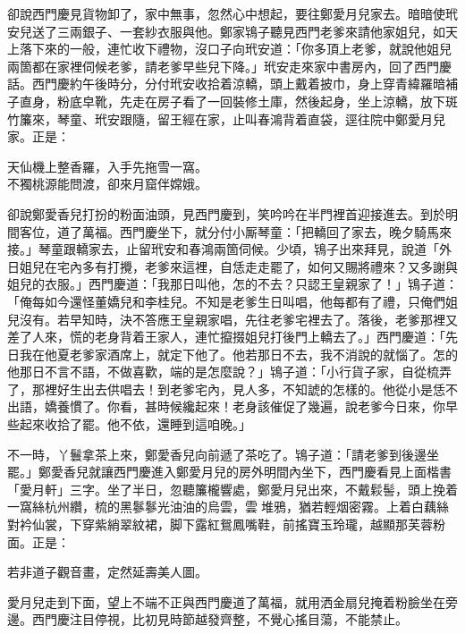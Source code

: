 卻說西門慶見貨物卸了，家中無事，忽然心中想起，要往鄭愛月兒家去。暗暗使玳安兒送了三兩銀子、一套紗衣服與他。鄭家鴇子聽見西門老爹來請他家姐兒，如天上落下來的一般，連忙收下禮物，沒口子向玳安道：「你多頂上老爹，就說他姐兒兩箇都在家裡伺候老爹，請老爹早些兒下降。」玳安走來家中書房內，回了西門慶話。西門慶約午後時分，分付玳安收拾着涼轎，頭上戴着披巾，身上穿青緯羅暗補子直身，粉底皁靴，先走在房子看了一回裝修土庫，然後起身，坐上涼轎，放下斑竹簾來，琴童、玳安跟隨，留王經在家，止叫春鴻背着直袋，逕往院中鄭愛月兒家。正是：

\begin{myquote} 
天仙機上整香羅，入手先拖雪一窩。\\不獨桃源能問渡，卻來月窟伴嫦娥。
\end{myquote} 

卻說鄭愛香兒打扮的粉面油頭，見西門慶到，笑吟吟在半門裡首迎接進去。到於明間客位，道了萬福。西門慶坐下，就分付小厮琴童：「把轎回了家去，晚夕騎馬來接。」琴童跟轎家去，止留玳安和春鴻兩箇伺候。少頃，鴇子出來拜見，說道「外日姐兒在宅內多有打攪，老爹來這裡，自恁走走罷了，如何又賜將禮來？又多謝與姐兒的衣服。」西門慶道：「我那日叫他，怎的不去？只認王皇親家了！」鴇子道：「俺每如今還怪董嬌兒和李桂兒。{}不知是老爹生日叫唱，他每都有了禮，只俺們姐兒沒有。若早知時，決不答應王皇親家唱，先往老爹宅裡去了。落後，老爹那裡又差了人來，慌的老身背着王家人，連忙攛掇姐兒打後門上轎去了。」西門慶道：「先日我在他夏老爹家酒席上，就定下他了。他若那日不去，我不消說的就惱了。怎的他那日不言不語，不做喜歡，{}端的是怎麼說？」鴇子道：「小行貨子家，自從梳弄了，那裡好生出去供唱去！到老爹宅內，見人多，不知諕的怎樣的。他從小是恁不出語，嬌養慣了。{}你看，甚時候纔起來！老身該催促了幾遍，說老爹今日來，你早些起來收拾了罷。他不依，還睡到這咱晚。」

不一時，丫鬟拿茶上來，鄭愛香兒向前遞了茶吃了。鴇子道：「請老爹到後邊坐罷。」鄭愛香兒就讓西門慶進入鄭愛月兒的房外明間內坐下，西門慶看見上面楷書「愛月軒」三字。坐了半日，忽聽簾櫳響處，鄭愛月兒出來，不戴鬏髻，頭上挽着一窩絲杭州纘，梳的黑鬖鬖光油油的烏雲，雲𩬆堆鴉，猶若輕烟密霧。上着白藕絲對衿仙裳，下穿紫綃翠紋裙，脚下露紅鴛鳳嘴鞋，前搖寶玉玲瓏，越顯那芙蓉粉面。正是：

\begin{myquote} 
若非道子觀音畫，定然延壽美人圖。
\end{myquote} 

愛月兒走到下面，望上不端不正與西門慶道了萬福，就用洒金扇兒掩着粉臉坐在旁邊。西門慶注目停視，比初見時節越發齊整，不覺心搖目蕩，不能禁止。

